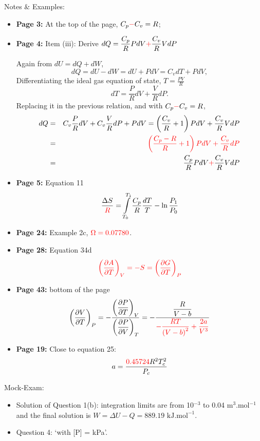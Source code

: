 \documentclass[12pts,a4paper,amsmath,amssymb,floatfix]{article}%
\newcommand{\frc}{\displaystyle\frac}
\newcommand{\red}{\textcolor{red}}
\newcommand{\Partial}[3][error]{\left(\frc{\partial #1}{\partial #2}\right)_{#3}}
\begin{document}
\noindent
{\Large Notes $\&$ Examples:}
\begin{itemize}
%
  \item {\bf Page 3:}  At the top of the page, $C_{p}\red{-}C_{v}=R$;
%
  \item {\bf Page 4:}  Item (iii): Derive $dQ=\frc{C_{p}}{R} PdV \red{+} \frc{C_{v}}{R} VdP$

           Again from $dU = dQ + dW$,
           \begin{displaymath}
               dQ = dU -dW = dU + PdV = C_{v}dT + PdV,
           \end{displaymath}
           Differentiating the ideal gas equation of state, $T=\frc{PV}{R}$
           \begin{displaymath}
                dT = \frc{P}{R}dV + \frc{V}{R}dP.
           \end{displaymath}
           Replacing it in the previous relation, and with $C_{p}\red{-}C_{v}=R$,
           \begin{eqnarray}
             dQ &=& C_{v}\frc{P}{R}dV + C_{v}\frc{V}{R}dP + PdV = \left(\frc{C_{v}}{R}+1\right)PdV + \frc{C_{v}}{R}VdP \nonumber \\
                &=& \red{\left(\frc{C_{p}-R}{R}+1\right)PdV + \frc{C_{v}}{R}dP} \nonumber \\
                &=&  \frc{C_{p}}{R} PdV \red{+} \frc{C_{v}}{R} VdP  \nonumber
           \end{eqnarray}
%
   \item {\bf Page 5:} Equation 11
     \begin{displaymath}
       \frc{\Delta S}{\red{R}} = \int\limits_{T_{0}}^{T_{1}} \frc{C_{p}}{R}\frc{dT}{T} - \ln{\frc{P_{1}}{P_{0}}}
     \end{displaymath}
%
   \item {\bf Page 24:} Example 2c, $\red{\Omega=0.07780}$.
%
   \item {\bf Page 28:} Equation 34d
     \begin{displaymath}
        \red{\left(\frc{\partial A}{\partial T}\right)_{V} = -S =  \left(\frc{\partial G}{\partial T}\right)_{P}}
     \end{displaymath}
%
   \item {\bf Page 43:} bottom of the page
     \begin{displaymath}
       \Partial[V]{T}{P} = -\frc{\Partial[P]{T}{V}}{\Partial[P]{V}{T}} = -\frc{\frc{R}{V-b}}{\red{-\frc{RT}{\left(V-b\right)^{2}}+\frc{2a}{V^{3}}}} 
     \end{displaymath}


   \item {\bf Page 19:} Close to equation 25: 
                          \begin{displaymath}
                              a = \frc{\red{0.45724} R^{2}T_{c}^{2}}{P_{c}}
                          \end{displaymath}      
           
%
\end{itemize}

\noindent
{\Large Mock-Exam:}
\begin{itemize}
% 
  \item Solution of Question 1(b): integration limits are from 10$^{-3}$ to 0.04 m$^{3}$.mol$^{-1}$ and the final solution is $W= \Delta U - Q = 889.19\text{ kJ.mol}^{-1}$.
  \item Question 4: `with [P] = kPa'.
%
\end{itemize}
\end{document}
